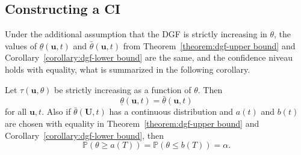 \subsection{Constructing a CI}

Under the additional assumption that the DGF is strictly increasing in $\theta$,
the values of $\underline \theta (\mathbf u, t)$ and $\bar \theta (\mathbf u, t)$ from Theorem~\ref{theorem:dgf-upper bound} and
Corollary~\ref{corollary:dgf-lower bound} are the same, and the confidence
niveau holds with equality, what is summarized in the following corollary.

\begin{corollary} \label{corollary:Corollary 2 Lindqvist}
	Let $\tau(\mathbf u, \theta)$ be strictly increasing as a function of $\theta$. 
	Then 
	\[
		\underline \theta (\mathbf u, t) = \bar \theta (\mathbf u, t)
	\]
	for all $\mathbf u, t$. Also if $ \bar \theta (\mathbf U, t)$ has a continuous distribution and $a(t)$ and $b(t)$ are chosen with equality in Theorem~\ref{theorem:dgf-upper bound} and Corollary~\ref{corollary:dgf-lower bound}, then 
	\[
		\mathbb{P} \left( \theta \geq a(T) \right)
		=
		\mathbb{P} \left( \theta \leq b(T) \right)
		=
		\alpha.
	\]
\end{corollary}


